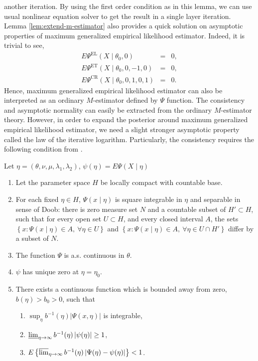 another iteration. By using the first order condition as in this lemma,
we can use usual nonlinear equation solver to get the result in a
single layer iteration.  Lemma \ref{lem:extend-m-estimator}
also provides a quick solution on asymptotic properties of maximum
generalized empirical likelihood estimator. Indeed, it is trivial
to see, 
\begin{eqnarray*}
E\Psi^{\mathrm{EL}}\left(X\mid\theta_{0},0\right) & = & 0,\\
E\Psi^{\mathrm{ET}}\left(X\mid\theta_{0},0,-1,0\right) & = & 0,\\
E\Psi^{\mathrm{CR}}\left(X\mid\theta_{0},0,1,0,1\right) & = & 0.
\end{eqnarray*}
Hence, maximum generalized empirical likelihood estimator can also
be interpreted as an ordinary $M$-estimator defined by $\Psi$ function.
The consistency and asymptotic normality can  easily be extracted from
the ordinary $M$-estimator theory. However, in order to expand the posterior
around maximum generalized empirical likelihood estimator, we need
a slight stronger asymptotic property called the law of the iterative logarithm.
Particularly, the consistency requires the following condition from 
\citet{huber1967behavior}.
\begin{assumption}
\label{assu:consistency-m-est}%
Let $\eta=\left(\theta,\nu,\mu,\lambda_{1},\lambda_{2}\right)$, $\psi\left(\eta\right)=E\Psi\left(X\mid\eta\right)$
	\begin{enumerate}
	\item Let the parameter space $H$ be locally compact with countable base.
	\item For each fixed $\eta\in H$, $\Psi\left(x\mid\eta\right)$ is square
	integrable in $\eta$ and separable in sense of Doob: there is zero
	measure set $N$ and a countable subset of $H'\subset H$, such that
	for every open set $U\subset H$, and every closed interval $A$,
	the sets $\left\{ x:\Psi\left(x\mid\eta\right)\in A,\:\forall\eta\in U\right\} $
	and $\left\{ x:\Psi\left(x\mid\eta\right)\in A,\:\forall\eta\in U\cap H'\right\} $
	differ by a subset of $N$.
	\item The function $\Psi$ is a.s. continuous in $\theta$. 
	\item $\psi$ has unique zero at $\eta=\eta_0$.
	\item There exists a continuous function which is bounded away from zero, 
			$b(\eta)>b_0>0$, such that
			\begin{enumerate}
				\item $\sup_\eta b^{-1}(\eta)\left|\Psi(x,\eta)\right|$ is 	 
					integrable,
				\item $\varliminf_{\eta \rightarrow \infty} b^{-1}(\eta) \left|
					\psi(\eta)\right| \ge 1$,
				\item $E\left\{ \varlimsup_{\eta \rightarrow \infty} b^{-1}(\eta)
						\left|\Psi(\eta)-\psi(\eta)\right|\right\} <1$.
			\end{enumerate}
	\end{enumerate}
\end{assumption}
